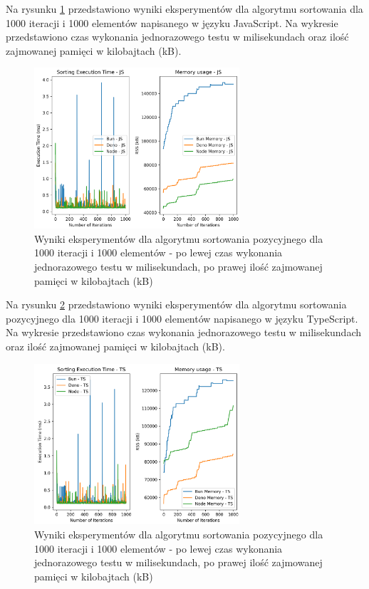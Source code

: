 Na rysunku \ref{fig:radix_sorting_e3} przedstawiono wyniki eksperymentów dla algorytmu sortowania  dla 1000 iteracji i 1000 elementów napisanego w języku JavaScript. Na wykresie przedstawiono czas wykonania jednorazowego testu w milisekundach oraz ilość zajmowanej pamięci w kilobajtach (kB).

\begin{figure}[H]
  \centering
  \includegraphics[width=0.68\textwidth]{Figures/sorting/sorting_radix_1000_1000_js.png}
  \caption{Wyniki eksperymentów dla algorytmu sortowania pozycyjnego dla 1000 iteracji i 1000 elementów - po lewej czas wykonania jednorazowego testu w milisekundach, po prawej ilość zajmowanej pamięci w kilobajtach (kB)}
  \label{fig:radix_sorting_e3}
\end{figure}

Na rysunku \ref{fig:radix_sorting_e3_ts} przedstawiono wyniki eksperymentów dla algorytmu sortowania pozycyjnego dla 1000 iteracji i 1000 elementów napisanego w języku TypeScript. Na wykresie przedstawiono czas wykonania jednorazowego testu w milisekundach oraz ilość zajmowanej pamięci w kilobajtach (kB).

\begin{figure}[H]
  \centering
  \includegraphics[width=0.68\textwidth]{Figures/sorting/sorting_radix_1000_1000_ts.png}
  \caption{Wyniki eksperymentów dla algorytmu sortowania pozycyjnego dla 1000 iteracji i 1000 elementów - po lewej czas wykonania jednorazowego testu w milisekundach, po prawej ilość zajmowanej pamięci w kilobajtach (kB)}
  \label{fig:radix_sorting_e3_ts}
\end{figure}

